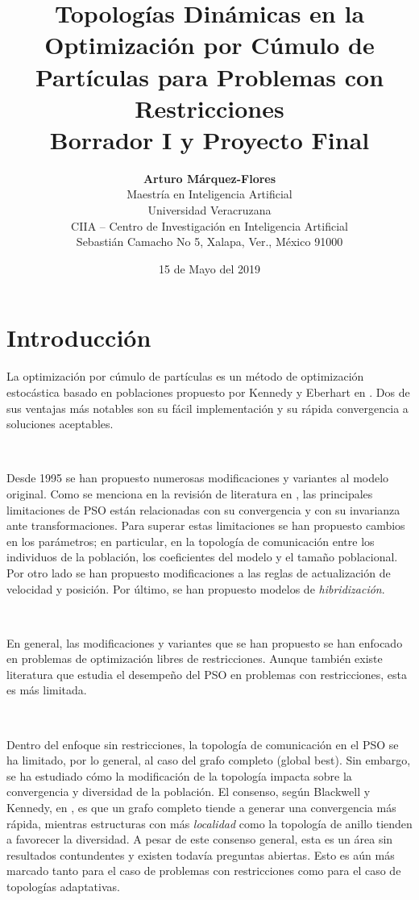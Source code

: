 \documentclass{article}
\begin{document}
\title{\textbf{Topologías Dinámicas en la Optimización por Cúmulo de Partículas para Problemas con Restricciones} \\
  Borrador I y Proyecto Final}
\author{
  \textbf{Arturo Márquez-Flores} \\
  Maestría en Inteligencia Artificial \\
  Universidad Veracruzana \\
  CIIA -- Centro de Investigación en Inteligencia Artificial \\
  Sebastián Camacho
  No 5, Xalapa, Ver., México 91000}
\date{15 de Mayo del 2019}

\maketitle

\section*{Introducción}

La optimización por cúmulo de partículas es un método de optimización estocástica basado en poblaciones propuesto por Kennedy y Eberhart en \cite{kennedy95}. Dos de sus ventajas más notables son su fácil implementación y su rápida convergencia a soluciones aceptables.

\

Desde 1995 se han propuesto numerosas modificaciones y variantes al modelo original. Como se menciona en la revisión de literatura en \cite{bonyadi17}, las principales limitaciones de PSO están relacionadas con su convergencia y con su invarianza ante transformaciones. Para superar estas limitaciones se han propuesto cambios en los parámetros; en particular, en la topología de comunicación entre los individuos de la población, los coeficientes del modelo y el tamaño poblacional. Por otro lado se han propuesto modificaciones a las reglas de actualización de velocidad y posición. Por último, se han propuesto modelos de \textit{hibridización}.

\

En general, las modificaciones y variantes que se han propuesto se han enfocado en problemas de optimización libres de restricciones. Aunque también existe literatura que estudia el desempeño del PSO en problemas con restricciones, esta es más limitada. 

\

Dentro del enfoque sin restricciones, la topología de comunicación en el PSO se ha limitado, por lo general, al caso del grafo completo (global best). Sin embargo, se ha estudiado cómo la modificación de la topología impacta sobre la convergencia y diversidad de la población. El consenso, según Blackwell y Kennedy, en \cite{blackwell18}, es que un grafo completo tiende a generar una convergencia más rápida, mientras estructuras con más \textit{localidad} como la topología de anillo tienden a favorecer la diversidad. A pesar de este consenso general, esta es un área sin resultados contundentes y existen todavía preguntas abiertas. Esto es aún más marcado tanto para el caso de problemas con restricciones como para el caso de topologías adaptativas. 
\end{document}
